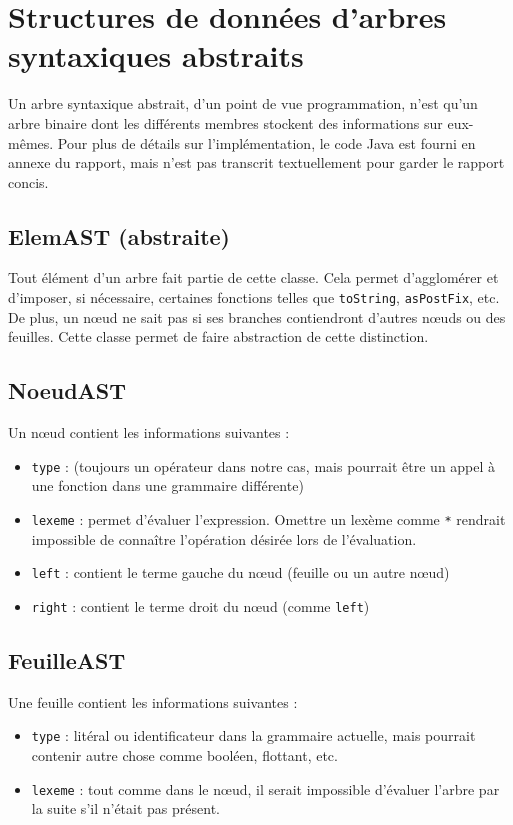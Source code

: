 \section{Structures de données d’arbres syntaxiques abstraits}

Un arbre syntaxique abstrait, d'un point de vue programmation, n'est qu'un
arbre binaire dont les différents membres stockent des informations sur eux-
mêmes. Pour plus de détails sur l'implémentation, le code Java est fourni en
annexe du rapport, mais n'est pas transcrit textuellement pour garder le
rapport concis.

\subsection{ElemAST (abstraite)}

Tout élément d'un arbre fait partie de cette classe. Cela permet d'agglomérer
et d'imposer, si nécessaire, certaines fonctions telles que \verb|toString|,
\verb|asPostFix|, etc. De plus, un nœud ne sait pas si ses branches
contiendront d'autres nœuds ou des feuilles. Cette classe permet de faire
abstraction de cette distinction.

\subsection{NoeudAST}

Un nœud contient les informations suivantes :

\begin{itemize}
  \item \verb|type| : (toujours un opérateur dans notre cas, mais pourrait être
        un appel à une fonction dans une grammaire différente)
  \item \verb|lexeme| : permet d'évaluer l'expression. Omettre un lexème comme
        \verb|*| rendrait impossible de connaître l'opération désirée lors de
        l'évaluation.
  \item \verb|left| : contient le terme gauche du nœud (feuille ou un autre nœud)
  \item \verb|right| : contient le terme droit du nœud (comme \verb|left|)
\end{itemize}

\subsection{FeuilleAST}

Une feuille contient les informations suivantes :

\begin{itemize}
  \item \verb|type| : litéral ou identificateur dans la grammaire actuelle, mais
        pourrait contenir autre chose comme booléen, flottant, etc.
  \item \verb|lexeme| : tout comme dans le nœud, il serait impossible
        d'évaluer l'arbre par la suite s'il n'était pas présent.
\end{itemize}
